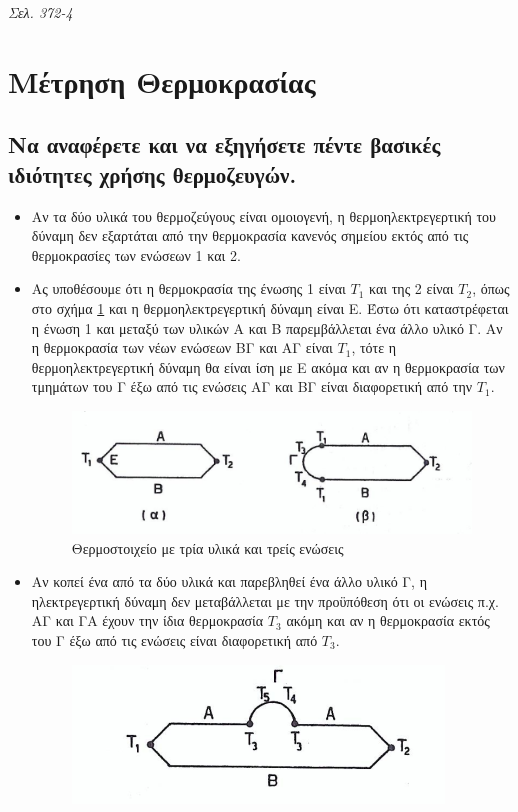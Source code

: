 \documentclass{article}
\begin{document}
\emph{Σελ. 372-4}
\section{Μέτρηση Θερμοκρασίας}
\subsection{Να αναφέρετε και να εξηγήσετε πέντε βασικές ιδιότητες χρήσης θερμοζευγών.}
\begin{itemize}
    \item Αν τα δύο υλικά του θερμοζεύγους είναι ομοιογενή, η θερμοηλεκτρεγερτική του δύναμη δεν εξαρτάται από την θερμοκρασία κανενός σημείου εκτός από τις θερμοκρασίες των ενώσεων 1
        και 2.
    \item Ας υποθέσουμε ότι η θερμοκρασία της ένωσης 1 είναι $T_1$ και της 2 είναι $T_2$, όπως στο σχήμα \ref{fig:7.1thermo1} και η θερμοηλεκτρεγερτική δύναμη είναι Ε. 
        Έστω ότι καταστρέφεται η ένωση 1 και μεταξύ των υλικών Α και Β παρεμβάλλεται ένα άλλο υλικό Γ. Αν η θερμοκρασία των νέων ενώσεων ΒΓ και ΑΓ είναι $T_1$, τότε η 
        θερμοηλεκτρεγερτική δύναμη θα είναι ίση με Ε ακόμα και αν η θερμοκρασία των τμημάτων του Γ έξω από τις ενώσεις ΑΓ και ΒΓ είναι διαφορετική από την $T_1$.
        \begin{figure}[h!]
            \includegraphics[width=\linewidth]{thermozevgi1.png}
            \caption{Θερμοστοιχείο με τρία υλικά και τρείς ενώσεις}
            \label{fig:7.1thermo1}
        \end{figure}
    \item Αν κοπεί ένα από τα δύο υλικά και παρεβληθεί ένα άλλο υλικό Γ, η ηλεκτρεγερτική δύναμη δεν μεταβάλλεται με την προϋπόθεση ότι οι ενώσεις π.χ. ΑΓ και ΓΑ έχουν την ίδια 
        θερμοκρασία $T_3$ ακόμη και αν η θερμοκρασία εκτός του Γ έξω από τις ενώσεις είναι διαφορετική από $T_3$. 
        \begin{figure}[h!]
            \includegraphics[width=\linewidth]{thermozevgi2.png}

\end{figure}
\end{itemize}
\end{document}
